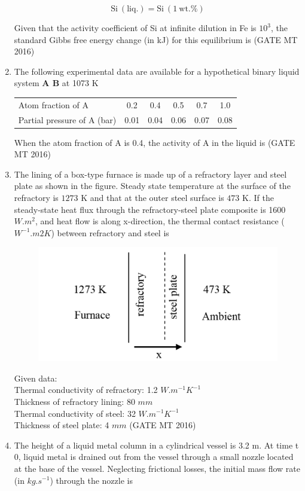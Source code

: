 \documentclass[journal, 11pt, onecolumn]{IEEEtran}
\theoremstyle{remark}
\begin{document}
\begin{enumerate}
$$\mathrm{Si\ (liq.)} = \mathrm{Si\ (1\ wt.\%)}$$

Given that the activity coefficient of Si at infinite dilution in Fe is $10^{3}$, the standard Gibbs free energy change (in kJ) for this equilibrium is 
\hfill(GATE MT 2016)

\item The following experimental data are available for a hypothetical binary liquid system \textbf{A B} at 1073 K

\begin{tabular}{lccccc}
Atom fraction of A & 0.2 & 0.4 & 0.5 & 0.7 & 1.0 \\
Partial pressure of A (bar) & 0.01 & 0.04 & 0.06 & 0.07 & 0.08 \\
\end{tabular}

When the atom fraction of A is 0.4, the activity of A in the liquid is 
\hfill(GATE MT 2016)

\item The lining of a box-type furnace is made up of a refractory layer and steel plate as shown in the figure. Steady state temperature at the surface of the refractory is $1273$ K and that at the outer steel surface is $473$ K. If the steady-state heat flux through the refractory-steel plate composite is 1600 $W.m^2$, and heat flow is along x-direction, the thermal contact resistance ($W^{-1}.m2K$) between refractory and steel is
\begin{figure}[H]
    \centering
    \includegraphics[width=0.5\linewidth]{figs/image4'.png}
    \caption{}
    \label{fig:placeholder}
\end{figure}

    Given data:\\
    Thermal conductivity of refractory: 1.2 $W.m^{-1}K^{-1}$\\
    Thickness of refractory lining: 80 $mm$\\
    Thermal conductivity of steel: 32 $W.m^{-1}K^{-1}$\\
    Thickness of steel plate: 4 $mm$
\hfill(GATE MT 2016)

\item The height of a liquid metal column in a cylindrical vessel is 3.2 m. At time t 0, liquid metal is drained out from the vessel through a small nozzle located at the base of the vessel. Neglecting frictional losses, the initial mass flow rate (in $kg.s^{-1}$) through the nozzle is 



\end{enumerate}
\end{document}
